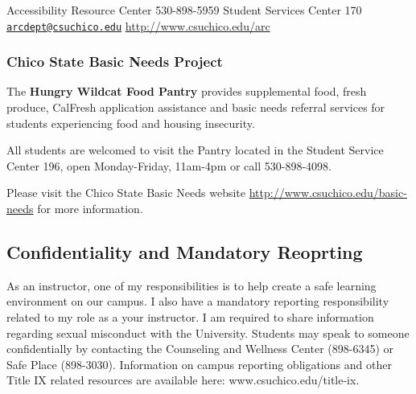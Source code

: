 \documentclass[
  11pt,
]{article}
\begin{document}
Accessibility Resource Center 530-898-5959 Student Services Center 170
\href{mailto:arcdept@csuchico.edu}{\nolinkurl{arcdept@csuchico.edu}}
\url{http://www.csuchico.edu/arc}

\hypertarget{chico-state-basic-needs-project}{%
\subsubsection{Chico State Basic Needs
Project}\label{chico-state-basic-needs-project}}

The \textbf{Hungry Wildcat Food Pantry} provides supplemental food,
fresh produce, CalFresh application assistance and basic needs referral
services for students experiencing food and housing insecurity.

All students are welcomed to visit the Pantry located in the Student
Service Center 196, open Monday-Friday, 11am-4pm or call 530-898-4098.

Please visit the Chico State Basic Needs website
\url{http://www.csuchico.edu/basic-needs} for more information.

\hypertarget{confidentiality-and-mandatory-reoprting}{%
\subsection{Confidentiality and Mandatory
Reoprting}\label{confidentiality-and-mandatory-reoprting}}

As an instructor, one of my responsibilities is to help create a safe
learning environment on our campus. I also have a mandatory reporting
responsibility related to my role as a your instructor. I am required to
share information regarding sexual misconduct with the University.
Students may speak to someone confidentially by contacting the
Counseling and Wellness Center (898-6345) or Safe Place (898-3030).
Information on campus reporting obligations and other Title IX related
resources are available here: www.csuchico.edu/title-ix.
\end{document}
